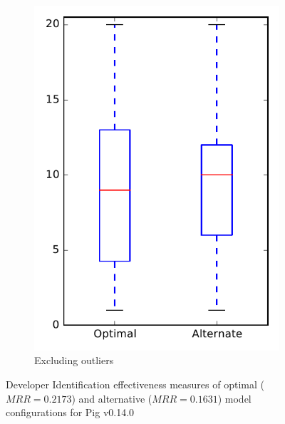 \begin{figure}
\begin{subfigure}{.4\textwidth}
        \includegraphics[height=0.4\textheight]{figures/combo/dit_rq1_pig_no_outlier}
        \caption{Excluding outliers}\label{fig:combo:dit:rq1:pig_no_outlier}
    \end{subfigure}
\caption[Developer Identification effectiveness measures of optimal and alternative model configurations for Pig v0.14.0]%
{Developer Identification effectiveness measures of optimal ($MRR=0.2173$) and alternative ($MRR=0.1631$) model configurations for Pig v0.14.0}
\label{fig:combo:dit:rq1:pig}
\end{figure}
